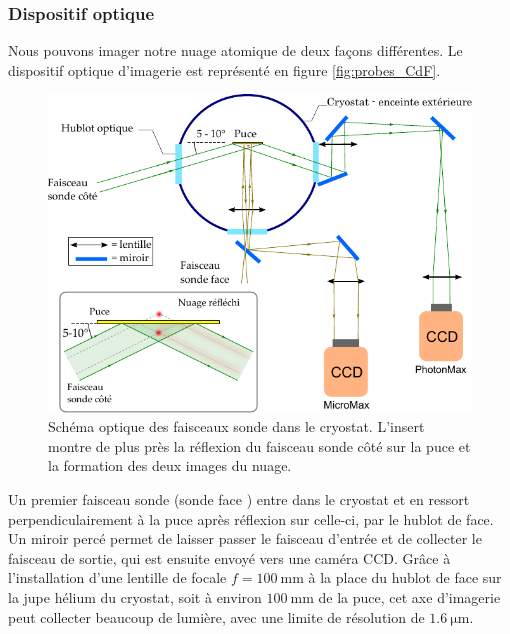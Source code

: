 	\subsubsection*{Dispositif optique}

Nous pouvons imager notre nuage atomique de deux façons différentes.
Le dispositif optique d'imagerie est représenté en figure \eqref{fig:probes_CdF}.
%
\begin{figure}[!h]
\centering
\includegraphics[width=.7\linewidth]{figures/setup/coldatoms/probes_CdF}
\caption[Faisceaux sonde]{Schéma optique des faisceaux sonde dans le cryostat.
L'insert montre de plus près la réflexion du faisceau sonde côté sur la puce et la formation des deux images du nuage.
}
\label{fig:probes_CdF}
\end{figure}
%
Un premier faisceau sonde (\og sonde face \fg{})  entre dans le cryostat et en ressort perpendiculairement à la puce après réflexion sur celle-ci, par le hublot de face.
Un miroir percé permet de laisser passer le faisceau d'entrée et de collecter le faisceau de sortie, qui est ensuite envoyé vers une caméra CCD.
Grâce à l'installation d'une lentille de focale $f=\SI{100}{\mm}$ à la place du hublot de face sur la jupe hélium du cryostat, soit à environ $\SI{100}{\mm}$ de la puce, cet axe d'imagerie peut collecter beaucoup de lumière, avec une limite de résolution de $\SI{1.6}{\um}$.

